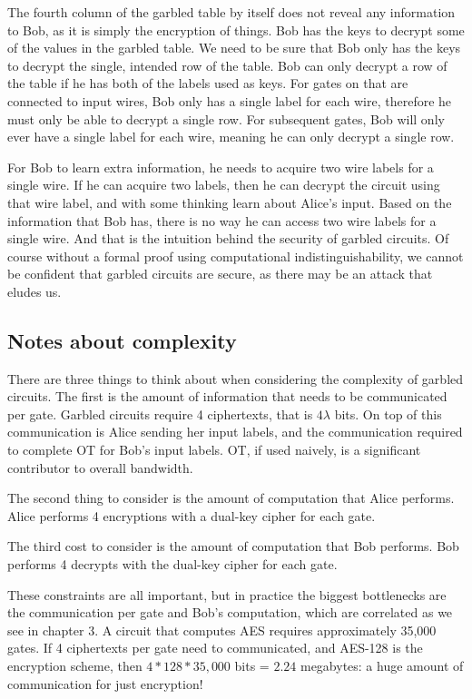 The fourth column of the garbled table by itself does not reveal any information to Bob, as it is simply the encryption of things.
Bob has the keys to decrypt some of the values in the garbled table.
We need to be sure that Bob only has the keys to decrypt the single, intended row of the table.
Bob can only decrypt a row of the table if he has both of the labels used as keys.
For gates on that are connected to input wires, Bob only has a single label for each wire, therefore he must only be able to decrypt a single row.
For subsequent gates, Bob will only ever have a single label for each wire, meaning he can only decrypt a single row.

For Bob to learn extra information, he needs to acquire two wire labels for a single wire.
If he can acquire two labels, then he can decrypt the circuit using that wire label, and with some thinking learn about Alice's input.
Based on the information that Bob has, there is no way he can access two wire labels for a single wire.
And that is the intuition behind the security of garbled circuits.
Of course without a formal proof using computational indistinguishability, we cannot be confident that garbled circuits are secure, as there may be an attack that eludes us.

\subsection{Notes about complexity}
There are three things to think about when considering the complexity of garbled circuits.
The first is the amount of information that needs to be communicated per gate.
Garbled circuits require 4 ciphertexts, that is $4\lambda$ bits.
On top of this communication is Alice sending her input labels, and the communication required to complete OT for Bob's input labels.
OT, if used naively, is a significant contributor to overall bandwidth.

The second thing to consider is the amount of computation that Alice performs.
Alice performs 4 encryptions with a dual-key cipher for each gate.

The third cost to consider is the amount of computation that Bob performs.
Bob performs 4 decrypts with the dual-key cipher for each gate.

These constraints are all important, but in practice the biggest bottlenecks are the communication per gate and Bob's computation, which are correlated as we see in chapter 3.
A circuit that computes AES requires approximately 35,000 gates.
If 4 ciphertexts per gate need to communicated, and AES-128 is the encryption scheme, then $4 * 128 * 35,000$ bits = $2.24$ megabytes: a huge amount of communication for just encryption!

